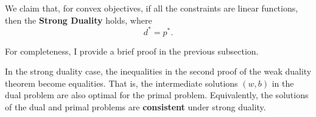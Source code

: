 \documentclass[../main]{subfiles}
\begin{document}
We claim that, for convex objectives, if all the constraints are linear functions, then the \textbf{Strong Duality} holds, where
\begin{equation}
    d^* = p^*.
\end{equation}

\begin{remark}
    For completeness, I provide a brief proof in the previous subsection. 
\end{remark}

In the strong duality case, the inequalities in the second proof of the weak duality theorem become equalities.  
That is, the intermediate solutions $(w,b)$ in the dual problem are also optimal for the primal problem.  
Equivalently, the solutions of the dual and primal problems are \textbf{consistent} under strong duality.
\end{document}
